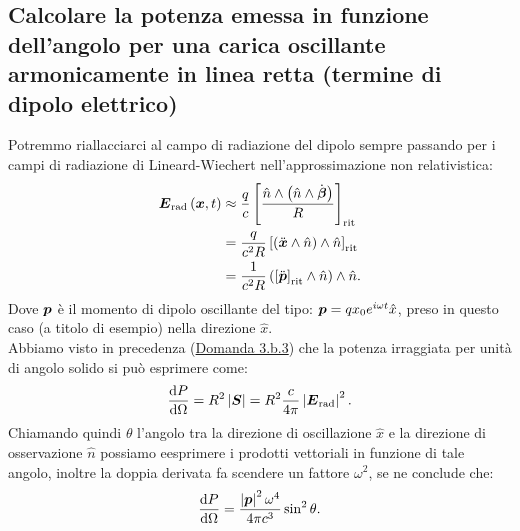 \subsection[]{Calcolare la potenza emessa in funzione dell’angolo per una carica oscillante armonicamente in linea retta (termine di dipolo elettrico)}
\label{sec:3.b.22}
Potremmo riallacciarci al campo di radiazione del dipolo sempre passando per i campi di radiazione di Lineard-Wiechert nell'approssimazione non relativistica:
\begin{align*}
\boldsymbol{E}_{\text{rad}}\left(\boldsymbol{x},t\right) 	&\approx\frac{q}{c}\left[\frac{\hat{n}\wedge\left(\hat{n}\wedge\dot{\boldsymbol{\beta}}\right)}{R}\right]_{\text{rit}} \\
						&= \frac{q}{c^2R} \left[ \left( \ddot{\boldsymbol{x}}\wedge \hat{n} \right)\wedge \hat{n}\right]_{\text{rit}}  \\
						&= \frac{1}{c^2R} \left( \left[ \ddot{\boldsymbol{p}} \right]_{\text{rit}}\wedge \hat{n}\right)\wedge \hat{n}
.\end{align*}
Dove $\boldsymbol{p}$ è il momento di dipolo oscillante del tipo: $\boldsymbol{p} = qx_0e^{i \omega t}\hat{x}$, preso in questo caso (a titolo di esempio) nella direzione $\hat{x}$.\\
Abbiamo visto in precedenza (\hyperref[sec:3.b.3]{Domanda 3.b.3}) che la potenza irraggiata per unità di angolo solido si può esprimere come:
\[
	\frac{\mbox{d} P}{\mbox{d} \Omega}  = R^2\left| \boldsymbol{S} \right| = R^2 \frac{c}{4\pi} \left| \boldsymbol{E}_{\text{rad}} \right|^2 
.\] 
Chiamando quindi $\theta$ l'angolo tra la direzione di oscillazione $\hat{x}$ e la direzione di osservazione $\hat{n}$ possiamo eesprimere i prodotti vettoriali in funzione di tale angolo, inoltre la doppia derivata fa scendere un fattore $\omega^2$, se ne conclude che: 
\[
	\frac{\mbox{d} P}{\mbox{d} \Omega} = \frac{\left| \boldsymbol{p} \right|^2 \omega^4}{4\pi c^3} \sin^2\theta
.\] 

